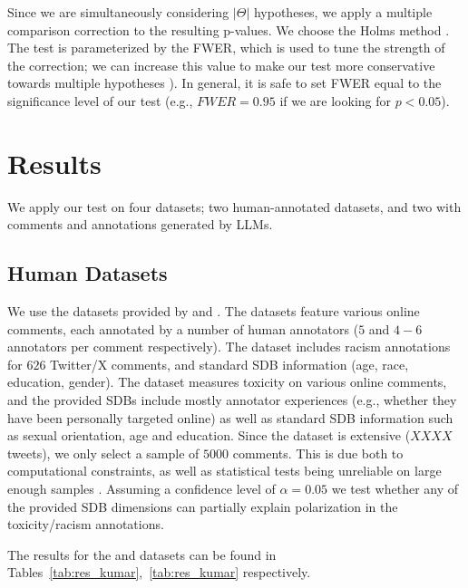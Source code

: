 \documentclass{article}
\begin{document}
Since we are simultaneously considering $\lvert \Theta \rvert$ hypotheses, we apply a multiple comparison correction to the resulting p-values. We choose the Holms method \parencite{holms}. The test is parameterized by the \ac{FWER}, which is used to tune the strength of the correction; we can increase this value to make our test more conservative towards multiple hypotheses \parencite{ChenFengYi2017}). In general, it is safe to set \ac{FWER} equal to the significance level of our test (e.g., $\textit{FWER} = 0.95$ if we are looking for $p < 0.05$).


\section{Results}
\label{sec:results}

We apply our test on four datasets; two human-annotated datasets, and two with comments and annotations generated by \acp{LLM}.

\subsection{Human Datasets}

We use the datasets provided by \textcite{kumar-et-al-2021} and \textcite{sap-etal-2022-annotators}. The datasets feature various online comments, each annotated by a number of human annotators ($5$ and $4-6$ annotators per comment respectively). The \textcite{sap-etal-2022-annotators} dataset includes racism annotations for $626$ Twitter/X comments, and standard \ac{SDB} information (age, race, education, gender). The \textcite{kumar-et-al-2021} dataset measures toxicity on various online comments, and the provided \acp{SDB} include mostly annotator experiences (e.g., whether they have been personally targeted online) as well as standard \ac{SDB} information such as sexual orientation, age and education. Since the dataset is extensive ($XXXX$ tweets), we only select a sample of $5000$ comments. This is due both to computational constraints, as well as statistical tests being unreliable on large enough samples \cite{trafimow2018manipulating}. Assuming a confidence level of $\alpha=0.05$ we test whether any of the provided \ac{SDB} dimensions can partially explain polarization in the toxicity/racism annotations. 

The results for the \textcite{kumar-et-al-2021} and \textcite{sap-etal-2022-annotators} datasets can be found in Tables~\ref{tab:res_kumar},~\ref{tab:res_kumar} respectively.
\end{document}
